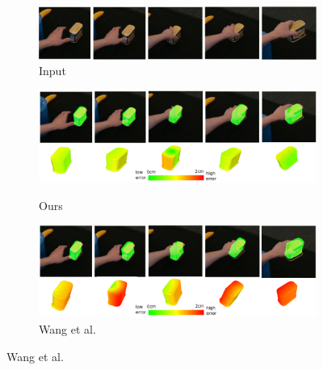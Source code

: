 \begin{figure}[!ht]
    \begin{subfigure}{0.98\textwidth}
        \includegraphics[width=\linewidth]{figs/1_rgb}
        \caption{Input}
    \end{subfigure}
    \hfill
    \begin{subfigure}{0.98\textwidth}
        \DIFdelbeginFL %
{%
}
\DIFdelendFL \includegraphics[width=\linewidth]{figs/1_1}
        \caption{Ours}
    \end{subfigure}
    \hfill
    \begin{subfigure}{0.98\textwidth}
        \includegraphics[width=\linewidth]{figs/1_2}
        \caption{Wang et al. \cite{wang2023deep}}
    \end{subfigure}
    \DIFdelbeginFL %

\end{figure}

